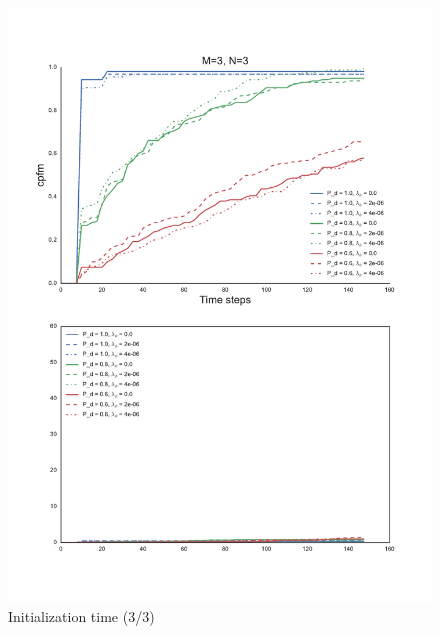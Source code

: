 {\begin{figure}
\centering
\includegraphics[height = .9\textheight]{Figures/plots/Scenario1_Init-Time(3-3).pdf}
\caption{Initialization time (3/3)}\label{fig:init_time_3-3}
\end{figure}

}
